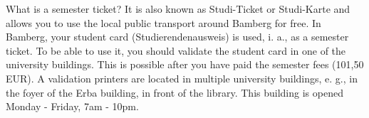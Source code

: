What is a semester ticket?
It is also known as Studi-Ticket or Studi-Karte and allows you to use the local public transport around Bamberg for free.
In Bamberg, your student card (Studierendenausweis) is used, i. a., as a semester ticket.
To be able to use it, you should validate the student card in one of the university buildings.
This is possible after you have paid the semester fees (101,50 EUR).
A validation printers are located in multiple university buildings, e. g., in the foyer of the Erba building, in front of the library.
This building is opened Monday - Friday, 7am - 10pm. 
